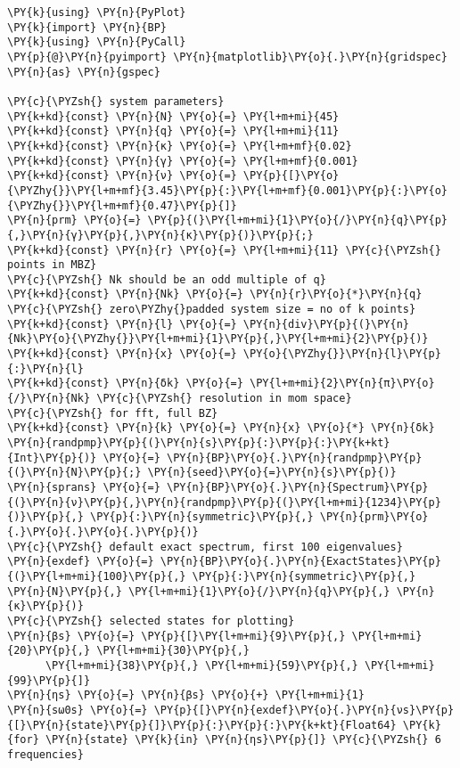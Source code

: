 \begin{Verbatim}[commandchars=\\\{\}]
\PY{k}{using} \PY{n}{PyPlot}
\PY{k}{import} \PY{n}{BP}
\PY{k}{using} \PY{n}{PyCall}
\PY{p}{@}\PY{n}{pyimport} \PY{n}{matplotlib}\PY{o}{.}\PY{n}{gridspec} \PY{n}{as} \PY{n}{gspec}

\PY{c}{\PYZsh{} system parameters}
\PY{k+kd}{const} \PY{n}{N} \PY{o}{=} \PY{l+m+mi}{45}
\PY{k+kd}{const} \PY{n}{q} \PY{o}{=} \PY{l+m+mi}{11}
\PY{k+kd}{const} \PY{n}{κ} \PY{o}{=} \PY{l+m+mf}{0.02}
\PY{k+kd}{const} \PY{n}{γ} \PY{o}{=} \PY{l+m+mf}{0.001}
\PY{k+kd}{const} \PY{n}{ν} \PY{o}{=} \PY{p}{[}\PY{o}{\PYZhy{}}\PY{l+m+mf}{3.45}\PY{p}{:}\PY{l+m+mf}{0.001}\PY{p}{:}\PY{o}{\PYZhy{}}\PY{l+m+mf}{0.47}\PY{p}{]}
\PY{n}{prm} \PY{o}{=} \PY{p}{(}\PY{l+m+mi}{1}\PY{o}{/}\PY{n}{q}\PY{p}{,}\PY{n}{γ}\PY{p}{,}\PY{n}{κ}\PY{p}{)}\PY{p}{;}
\PY{k+kd}{const} \PY{n}{r} \PY{o}{=} \PY{l+m+mi}{11} \PY{c}{\PYZsh{} points in MBZ}
\PY{c}{\PYZsh{} Nk should be an odd multiple of q}
\PY{k+kd}{const} \PY{n}{Nk} \PY{o}{=} \PY{n}{r}\PY{o}{*}\PY{n}{q} \PY{c}{\PYZsh{} zero\PYZhy{}padded system size = no of k points}
\PY{k+kd}{const} \PY{n}{l} \PY{o}{=} \PY{n}{div}\PY{p}{(}\PY{n}{Nk}\PY{o}{\PYZhy{}}\PY{l+m+mi}{1}\PY{p}{,}\PY{l+m+mi}{2}\PY{p}{)}
\PY{k+kd}{const} \PY{n}{x} \PY{o}{=} \PY{o}{\PYZhy{}}\PY{n}{l}\PY{p}{:}\PY{n}{l}
\PY{k+kd}{const} \PY{n}{δk} \PY{o}{=} \PY{l+m+mi}{2}\PY{n}{π}\PY{o}{/}\PY{n}{Nk} \PY{c}{\PYZsh{} resolution in mom space}
\PY{c}{\PYZsh{} for fft, full BZ}
\PY{k+kd}{const} \PY{n}{k} \PY{o}{=} \PY{n}{x} \PY{o}{*} \PY{n}{δk}
\PY{n}{randpmp}\PY{p}{(}\PY{n}{s}\PY{p}{:}\PY{p}{:}\PY{k+kt}{Int}\PY{p}{)} \PY{o}{=} \PY{n}{BP}\PY{o}{.}\PY{n}{randpmp}\PY{p}{(}\PY{n}{N}\PY{p}{;} \PY{n}{seed}\PY{o}{=}\PY{n}{s}\PY{p}{)}
\PY{n}{sprans} \PY{o}{=} \PY{n}{BP}\PY{o}{.}\PY{n}{Spectrum}\PY{p}{(}\PY{n}{ν}\PY{p}{,}\PY{n}{randpmp}\PY{p}{(}\PY{l+m+mi}{1234}\PY{p}{)}\PY{p}{,} \PY{p}{:}\PY{n}{symmetric}\PY{p}{,} \PY{n}{prm}\PY{o}{.}\PY{o}{.}\PY{o}{.}\PY{p}{)}
\PY{c}{\PYZsh{} default exact spectrum, first 100 eigenvalues}
\PY{n}{exdef} \PY{o}{=} \PY{n}{BP}\PY{o}{.}\PY{n}{ExactStates}\PY{p}{(}\PY{l+m+mi}{100}\PY{p}{,} \PY{p}{:}\PY{n}{symmetric}\PY{p}{,} \PY{n}{N}\PY{p}{,} \PY{l+m+mi}{1}\PY{o}{/}\PY{n}{q}\PY{p}{,} \PY{n}{κ}\PY{p}{)}
\PY{c}{\PYZsh{} selected states for plotting}
\PY{n}{βs} \PY{o}{=} \PY{p}{[}\PY{l+m+mi}{9}\PY{p}{,} \PY{l+m+mi}{20}\PY{p}{,} \PY{l+m+mi}{30}\PY{p}{,}
      \PY{l+m+mi}{38}\PY{p}{,} \PY{l+m+mi}{59}\PY{p}{,} \PY{l+m+mi}{99}\PY{p}{]}
\PY{n}{ηs} \PY{o}{=} \PY{n}{βs} \PY{o}{+} \PY{l+m+mi}{1}
\PY{n}{sω0s} \PY{o}{=} \PY{p}{[}\PY{n}{exdef}\PY{o}{.}\PY{n}{νs}\PY{p}{[}\PY{n}{state}\PY{p}{]}\PY{p}{:}\PY{p}{:}\PY{k+kt}{Float64} \PY{k}{for} \PY{n}{state} \PY{k}{in} \PY{n}{ηs}\PY{p}{]} \PY{c}{\PYZsh{} 6 frequencies}


\end{Verbatim}
